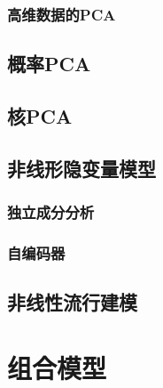 \documentclass[11pt]{ctexbook}
\begin{document}
\subsection{高维数据的PCA}

\section{概率PCA}
\section{核PCA}
\section{非线形隐变量模型}
\subsection{独立成分分析}
\subsection{自编码器}
\section{非线性流行建模}

\chapter{组合模型}
\end{document}
